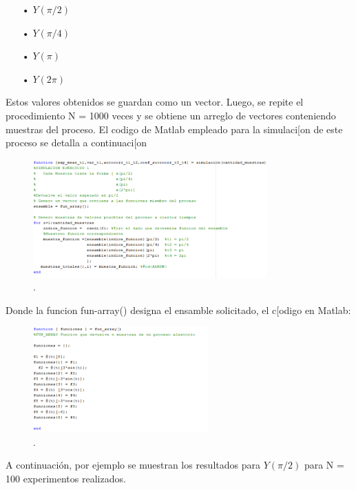 \begin{enumerate}
   \item[•] $Y(\pi/2)$
   \item[•] $Y(\pi/4)$
   \item[•] $Y(\pi)$
   \item[•] $Y(2\pi)$
\end{enumerate}

Estos valores obtenidos se guardan como un vector. Luego, se repite el procedimiento N = 1000 veces 
y se obtiene un arreglo de vectores conteniendo muestras del proceso.
El codigo de Matlab empleado para la simulaci[on de este proceso se detalla a continuaci[on 
\\

\begin{figure}[H]
\centering
	\includegraphics[width=0.8\textwidth, trim = {0 0 0 0},clip]{./ImagenesEjercicio1/main1.png}
	\caption{.}
	\label{fig:main1}
\end{figure}

Donde la funcion fun-array() designa el ensamble solicitado, el c[odigo en Matlab:

\begin{figure}[H]
\centering
	\includegraphics[width=0.6\textwidth, trim = {0 0 0 0},clip]{./ImagenesEjercicio1/fun_array.png}
	\caption{.}
	\label{fig:fun_array}
\end{figure}

A continuación, por ejemplo se muestran los resultados para $Y(\pi/2)$ para N = 100 experimentos realizados.

